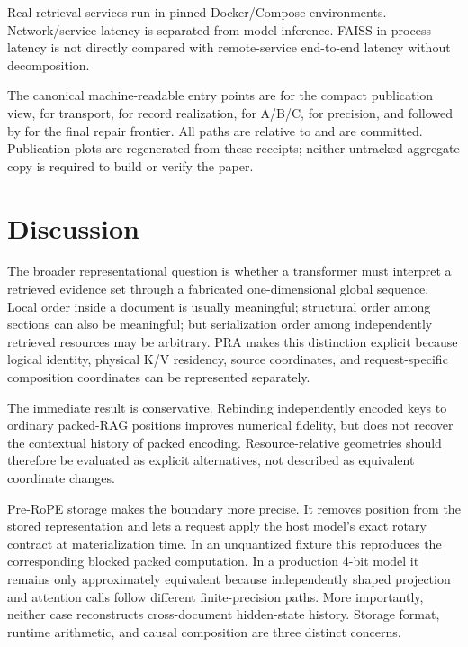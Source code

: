 \documentclass[11pt]{article}
\begin{document}
Real retrieval services run in pinned Docker/Compose environments.  Network/service latency is separated from model inference.  FAISS in-process latency is not directly compared with remote-service end-to-end latency without decomposition.

\begin{sloppypar}
\small
The canonical machine-readable entry points are
 for the compact
publication view,
 for transport,
 for record realization,
 for A/B/C,
 for precision, and
 followed by
 for the final repair frontier.
All paths are relative to
 and are committed. Publication
plots are regenerated from these receipts; neither untracked aggregate copy is
required to build or verify the paper.
\end{sloppypar}

\section{Discussion}

The broader representational question is whether a transformer must interpret a retrieved evidence set through a fabricated one-dimensional global sequence.  Local order inside a document is usually meaningful; structural order among sections can also be meaningful; but serialization order among independently retrieved resources may be arbitrary.  PRA makes this distinction explicit because logical identity, physical K/V residency, source coordinates, and request-specific composition coordinates can be represented separately.

The immediate result is conservative. Rebinding independently encoded keys to
ordinary packed-RAG positions improves numerical fidelity, but does not recover
the contextual history of packed encoding. Resource-relative geometries should
therefore be evaluated as explicit alternatives, not described as equivalent
coordinate changes.

Pre-RoPE storage makes the boundary more precise. It removes position from the
stored representation and lets a request apply the host model's exact rotary
contract at materialization time. In an unquantized fixture this reproduces the
corresponding blocked packed computation. In a production 4-bit model it remains
only approximately equivalent because independently shaped projection and
attention calls follow different finite-precision paths. More importantly,
neither case reconstructs cross-document hidden-state history. Storage format,
runtime arithmetic, and causal composition are three distinct concerns.
\end{document}

